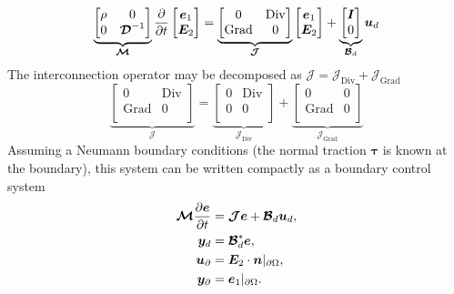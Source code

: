 \documentclass{svjour3}                     %
\DeclareMathOperator*{\Grad}{Grad}
\DeclareMathOperator*{\Div}{Div}
\begin{document}
\begin{equation*}
\underbrace{\begin{bmatrix}
	\rho & 0 \\ 0 & \bm{\mathcal{D}}^{-1} \\
	\end{bmatrix}}_{\bm{\mathcal{M}}}
\diffp{}{t}
\begin{bmatrix}
\bm{e}_1 \\ \bm{E}_2 \\
\end{bmatrix} = 
\underbrace{\begin{bmatrix}
	0 & \Div \\ \Grad & 0 \\
	\end{bmatrix}}_{\bm{\mathcal{J}}}
\begin{bmatrix}
\bm{e}_1 \\ \bm{E}_2 \\
\end{bmatrix} + 
\underbrace{\begin{bmatrix}
	\bm{I} \\ 0 \\
	\end{bmatrix}}_{\bm{\mathcal{B}}_d} \bm{u}_d 
\end{equation*}
The interconnection operator may be decomposed as $\bm{\mathcal{J}} = \bm{\mathcal{J}}_{\Div} + \bm{\mathcal{J}}_{\Grad}$
\begin{equation}
\underbrace{\begin{bmatrix}
	0 & \Div \\ \Grad & 0 \\
	\end{bmatrix}}_{\bm{\mathcal{J}}} = 
\underbrace{\begin{bmatrix}
	0 & \Div \\ 0  & 0 \\
	\end{bmatrix}}_{\bm{\mathcal{J}}_{\Div}} + 
\underbrace{\begin{bmatrix}
	0 & 0 \\ \Grad & 0 \\
	\end{bmatrix}}_{\bm{\mathcal{J}}_{\Grad}}
\end{equation}
Assuming a Neumann boundary conditions (the normal traction $\bm\tau$ is known at the boundary), this system can be written compactly as a boundary control system
\begin{equation}
\label{eq:eldyn_PDE}
\begin{aligned}
\bm{\mathcal{M}} \diffp{\bm{e}}{t} &= \bm{\mathcal{J}} \bm{e} + \bm{\mathcal{B}}_d \bm{u}_d, \\
\bm{y}_d &= \bm{\mathcal{B}}_d^* \bm{e}, \\
\bm{u}_\partial &= \bm{E}_2 \cdot \bm{n}|_{\partial\Omega}, \\
\bm{y}_\partial &= \bm{e}_1|_{\partial\Omega}.
\end{aligned}
\end{equation}
\end{document}
